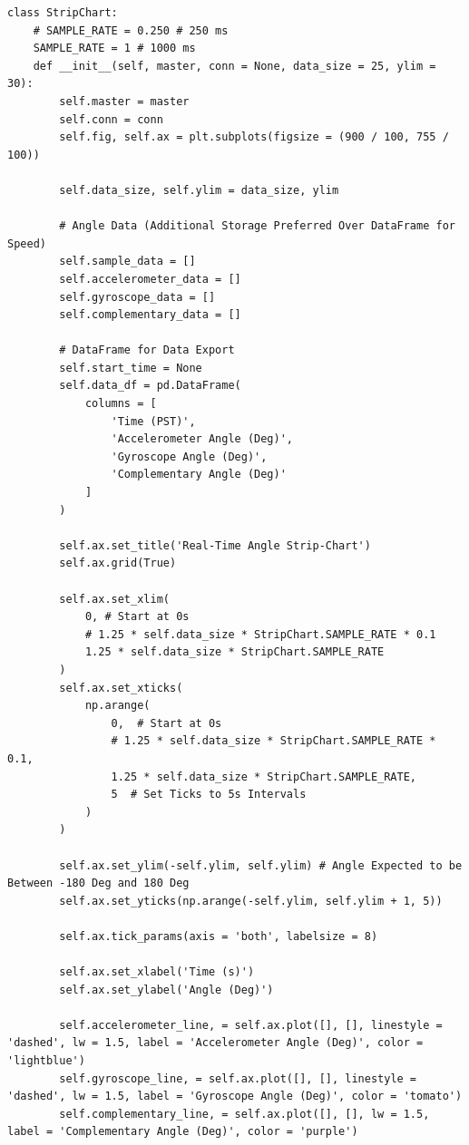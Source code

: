 \documentclass{article}
\begin{document}
\begin{lstlisting}[caption={Python Stripchart}, label={lst:stripchart_code}]
    class StripChart:
    # SAMPLE_RATE = 0.250 # 250 ms
    SAMPLE_RATE = 1 # 1000 ms
    def __init__(self, master, conn = None, data_size = 25, ylim = 30):
        self.master = master
        self.conn = conn
        self.fig, self.ax = plt.subplots(figsize = (900 / 100, 755 / 100))

        self.data_size, self.ylim = data_size, ylim

        # Angle Data (Additional Storage Preferred Over DataFrame for Speed)
        self.sample_data = []
        self.accelerometer_data = []
        self.gyroscope_data = []
        self.complementary_data = []

        # DataFrame for Data Export
        self.start_time = None
        self.data_df = pd.DataFrame(
            columns = [
                'Time (PST)',
                'Accelerometer Angle (Deg)',
                'Gyroscope Angle (Deg)',
                'Complementary Angle (Deg)'
            ]
        )

        self.ax.set_title('Real-Time Angle Strip-Chart')
        self.ax.grid(True)

        self.ax.set_xlim(
            0, # Start at 0s
            # 1.25 * self.data_size * StripChart.SAMPLE_RATE * 0.1
            1.25 * self.data_size * StripChart.SAMPLE_RATE
        )
        self.ax.set_xticks(
            np.arange(
                0,  # Start at 0s
                # 1.25 * self.data_size * StripChart.SAMPLE_RATE * 0.1,
                1.25 * self.data_size * StripChart.SAMPLE_RATE,
                5  # Set Ticks to 5s Intervals
            )
        )

        self.ax.set_ylim(-self.ylim, self.ylim) # Angle Expected to be Between -180 Deg and 180 Deg
        self.ax.set_yticks(np.arange(-self.ylim, self.ylim + 1, 5))

        self.ax.tick_params(axis = 'both', labelsize = 8)

        self.ax.set_xlabel('Time (s)')
        self.ax.set_ylabel('Angle (Deg)')

        self.accelerometer_line, = self.ax.plot([], [], linestyle = 'dashed', lw = 1.5, label = 'Accelerometer Angle (Deg)', color = 'lightblue')
        self.gyroscope_line, = self.ax.plot([], [], linestyle = 'dashed', lw = 1.5, label = 'Gyroscope Angle (Deg)', color = 'tomato')
        self.complementary_line, = self.ax.plot([], [], lw = 1.5, label = 'Complementary Angle (Deg)', color = 'purple')


\end{lstlisting}
\end{document}
